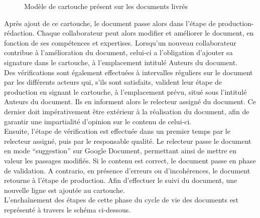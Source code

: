 \begin{figure}[H]
\centering
\label{fig-cartouche}
\caption{Modèle de cartouche présent sur les documents livrés}
\end{figure}

Après ajout de ce cartouche, le document passe alors dans l’étape de \og{}production-rédaction\fg{}. Chaque collaborateur peut alors modifier et améliorer le document, en fonction de ses compétences et expertises. Lorsqu’un nouveau collaborateur contribue à l’amélioration du document, celui-ci a l’obligation d’ajouter sa signature dans le cartouche, à l’emplacement intitulé \og{}Auteurs du document\fg{}. \\
 
Des vérifications sont également effectuées à intervalles réguliers sur le document par les différents acteurs qui, s'ils sont satisfaits, valident leur étape de production en signant le cartouche, à l’emplacement prévu, situé sous l’intitulé \og{}Auteurs du document\fg{}. Ils en informent alors le relecteur assigné du document. Ce dernier doit impérativement être extérieur à la réalisation du document, afin de garantir une impartialité d’opinion sur le contenu de celui-ci. \\
 
Ensuite, l’étape de vérification est effectuée dans un premier temps par le relecteur assigné, puis par le responsable qualité. Le relecteur passe le document en mode “suggestion” sur Google Document, permettant ainsi de mettre en valeur les passages modifiés. Si le contenu est correct, le document passe en phase de validation. A contrario, en présence d’erreurs ou d’incohérences, le document retourne à l’étape de production. Afin d'effectuer le suivi du document, une nouvelle ligne est ajoutée au cartouche. \\
 
L’enchaînement des étapes de cette phase du cycle de vie des documents est représenté à travers le schéma ci-dessous. \\

